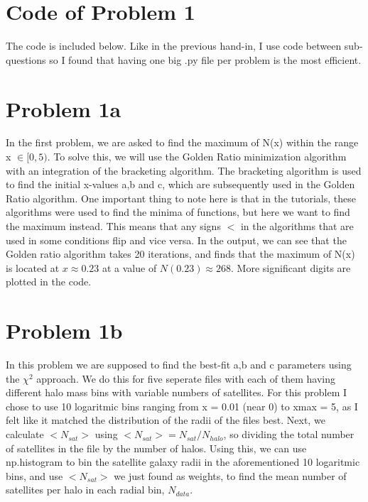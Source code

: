 \section*{Code of Problem 1}

The code is included below. Like in the previous hand-in, I use code between sub-questions so I found that having one big .py file per problem is the most efficient.



\section*{Problem 1a}

In the first problem, we are asked to find the maximum of N(x) within the range x $\in [0,5)$. To solve this, we will use the Golden Ratio minimization algorithm with an integration of the bracketing algorithm. The bracketing algorithm is used to find the initial x-values a,b and c, which are subsequently used in the Golden Ratio algorithm. One important thing to note here is that in the tutorials, these algorithms were used to find the minima of functions, but here we want to find the maximum instead. This means that any signs $<$ in the algorithms that are used in some conditions flip and vice versa. In the output, we can see that the Golden ratio algorithm takes 20 iterations, and finds that the maximum of N(x) is located at $x \approx 0.23$ at a value of $N(0.23) \approx 268$. More significant digits are plotted in the code. 



\section*{Problem 1b}

In this problem we are supposed to find the best-fit a,b and c parameters using the $\chi^2$ approach. We do this for five seperate files with each of them having different halo mass bins with variable numbers of satellites. For this problem I chose to use 10 logaritmic bins ranging from x = 0.01 (near 0) to xmax = 5, as I felt like it matched the distribution of the radii of the files best. Next, we calculate $<N_{sat}>$ using $<N_{sat}> = N_{sat} / N_{halo}$, so dividing the total number of satellites in the file by the number of halos. Using this, we can use np.histogram to bin the satellite galaxy radii in the aforementioned 10 logaritmic bins, and use $<N_{sat}>$ we just found as weights, to find the mean number of satellites per halo in each radial bin, $N_{data}$.\\

